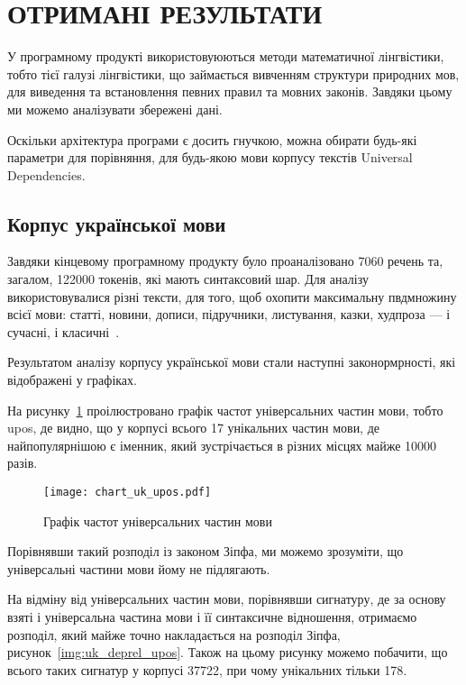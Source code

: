 \section{ОТРИМАНІ РЕЗУЛЬТАТИ}

У програмному продукті використовуюються методи математичної лінгвістики,
тобто тієї галузі лінгвістики,
що займається вивченням структури природних мов, для виведення та встановлення
певних правил та мовних законів. Завдяки цьому ми можемо аналізувати збережені дані.

Оскільки архітектура програми є досить гнучкою, можна обирати будь-які
параметри для порівняння, для будь-якою мови корпусу текстів Universal
Dependencies.

\subsection{Корпус української мови}
Завдяки кінцевому програмному продукту було проаналізовано 7060 речень 
та, загалом, 122000 токенів, які мають синтаксовий шар.
Для аналізу використовувалися різні тексти, для того, щоб охопити максимальну
пвдмножину всієї мови: статті, новини, дописи, підручники, листування, казки,
худпроза — і сучасні, і класичні~\cite{bib12}.

Результатом аналізу корпусу української мови стали наступні законормрності,
які відображені у графіках.

На рисунку~\ref{img:uk_upos} проілюстровано графік частот універсальних
частин мови, тобто upos, де видно, що у корпусі всього 17 унікальних
частин мови, де найпопулярнішою є іменник, який зустрічається в різних
місцях майже 10000 разів.

\begin{figure}[ht]
  \begin{center}
    \texttt{[image: chart\_uk\_upos.pdf]}
  \end{center}
  \caption{Графік частот універсальних частин мови}
  \label{img:uk_upos}
\end{figure}

\newpage
Порівнявши такий розподіл із законом Зіпфа, ми можемо зрозуміти, що
універсальні частини мови йому не підлягають.

На відміну від універсальних частин мови, порівнявши сигнатуру, де за основу
взяті і універсальна частина мови і її синтаксичне відношення, отримаємо
розподіл, який майже точно накладається на розподіл Зіпфа,
рисунок~\ref{img:uk_deprel_upos}. Також на цьому рисунку можемо побачити, що 
всього таких сигнатур у корпусі 37722, при чому унікальних
тільки 178.

